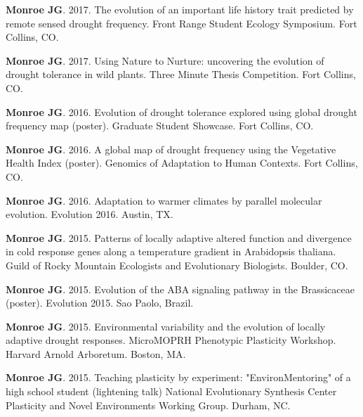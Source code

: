 \documentclass[12pt,english]{article}
\begin{document}
\begin{hangparas}{.5in}{1}
\vspace{0.5ex}\par
\hspace{1em}\textbf{Monroe JG}. 2017. The evolution of an important life history trait predicted by remote sensed drought frequency. Front Range Student Ecology Symposium. Fort Collins, CO.
\vspace{0.5ex}\par
\hspace{1em}\textbf{Monroe JG}. 2017. Using Nature to Nurture: uncovering the evolution of drought tolerance in wild plants. Three Minute Thesis Competition. Fort Collins, CO.
\vspace{0.5ex}\par
\hspace{1em}\textbf{Monroe JG}. 2016. Evolution of drought tolerance explored using global drought frequency map (poster). Graduate Student Showcase. Fort Collins, CO.
\vspace{0.5ex}\par
\hspace{1em}\textbf{Monroe JG}. 2016. A global map of drought frequency using the Vegetative Health Index (poster). Genomics of Adaptation to Human Contexts. Fort Collins, CO.
\vspace{0.5ex}\par
\hspace{1em}\textbf{Monroe JG}. 2016. Adaptation to warmer climates by parallel molecular evolution. Evolution 2016. Austin, TX.
\vspace{0.5ex}\par
\hspace{1em}\textbf{Monroe JG}. 2015. Patterns of locally adaptive altered function and divergence in cold response genes along a temperature gradient in Arabidopsis thaliana. Guild of Rocky Mountain Ecologists and Evolutionary Biologists. Boulder, CO.
\vspace{0.5ex}\par
\hspace{1em}\textbf{Monroe JG}. 2015. Evolution of the ABA signaling pathway in the Brassicaceae (poster). Evolution 2015. Sao Paolo, Brazil.
\vspace{0.5ex}\par
\hspace{1em}\textbf{Monroe JG}. 2015. Environmental variability and the evolution of locally adaptive drought responses. MicroMOPRH Phenotypic Plasticity Workshop. Harvard Arnold Arboretum. Boston, MA.
\vspace{0.5ex}\par
\hspace{1em}\textbf{Monroe JG}. 2015. Teaching plasticity by experiment: "EnvironMentoring" of a high school student (lightening talk) National Evolutionary Synthesis Center Plasticity and Novel Environments Working Group. Durham, NC.
\vspace{0.5ex}\par
\end{hangparas}
\end{document}
